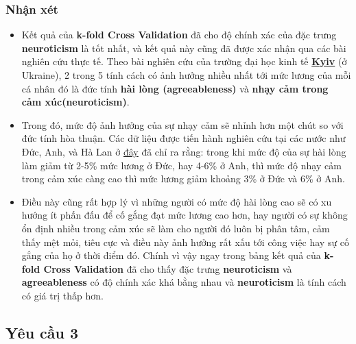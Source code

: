 \documentclass{report}
\begin{document}
    \subsubsection{Nhận xét}
    \begin{itemize}
        \item Kết quả của \textbf{k-fold Cross Validation} đã cho độ chính xác của đặc trưng \textbf{neuroticism} là tốt nhất, và kết quả này cũng đã được xác nhận qua các bài nghiên cứu thực tế. Theo bài nghiên cứu của trường đại học kinh tế \href{https://kse.ua/}{\textbf{Kyiv}} (ở Ukraine), 2 trong 5 tính cách có ảnh hưởng nhiều nhất tới mức lương của mỗi cá nhân đó là đức tính \textbf{hài lòng (agreeableness)} và \textbf{nhạy cảm trong cảm xúc(neuroticism)}.
        \item Trong đó, mức độ ảnh hưởng của sự nhạy cảm sẽ nhỉnh hơn một chút so với đức tính hòa thuận. Các dữ liệu được tiến hành nghiên cứu tại các nước như Đức, Anh, và Hà Lan ở \href{https://kse.ua/kse-research/relationship-between-your-personality-and-your-salary-level/}{đây} đã chỉ ra rằng: trong khi mức độ của sự hài lòng làm giảm từ 2-5\% mức lương ở Đức, hay 4-6\% ở Anh, thì mức độ nhạy cảm trong cảm xúc càng cao thì mức lương giảm khoảng 3\% ở Đức và 6\% ở Anh.
        \item Điều này cũng rất hợp lý vì những người có mức độ hài lòng cao sẽ có xu hướng ít phấn đấu để  cố gắng đạt mức lương cao hơn, hay người có sự không ổn định nhiều trong cảm xúc sẽ làm cho người đó luôn bị phân tâm, cảm thấy mệt mỏi, tiêu cực và điều này ảnh hưởng rất xấu tới công việc hay sự cố gắng của họ ở thời điểm đó. Chính vì vậy ngay trong bảng kết quả của \textbf{k-fold Cross Validation} đã cho thấy đặc trưng \textbf{neuroticism} và \textbf{agreeableness} có độ chính xác khá bằng nhau và \textbf{neuroticism} là tính cách có giá trị thấp hơn.
    \end{itemize}

\subsection{Yêu cầu 3}
\end{document}
